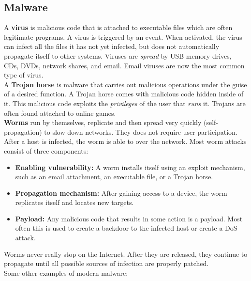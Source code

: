 \subsection{Malware}

A \textbf{virus} is malicious code that is attached to executable files which are often legitimate programs. A virus is triggered by an event. When activated, the virus can infect all the files it has not yet infected, but does not automatically propagate itself to other systems. Viruses are \emph{spread} by USB memory drives, CDs, DVDs, network shares, and email. Email viruses are now the most common type of virus.\\

A \textbf{Trojan horse} is malware that carries out malicious operations under the guise of a desired function. A Trojan horse comes with malicious code hidden inside of it. This malicious code exploits the \emph{privileges} of the user that \emph{runs} it. Trojans are often found attached to online games. \\

\textbf{Worms} run by themselves, replicate and then spread very quickly (self-propagation) to slow down networks. They does not require user participation. After a host is infected, the worm is able to  over the network. Most worm attacks consist of three components:

\begin{itemize}
\item \textbf{Enabling vulnerability:} A worm installs itself using an exploit mechanism, such as an email attachment, an executable file, or a Trojan horse.
\item \textbf{Propagation mechanism:} After gaining access to a device, the worm replicates itself and locates new targets.
\item \textbf{Payload:} Any malicious code that results in some action is a payload. Most often this is used to create a backdoor to the infected host or create a DoS attack.
\end{itemize}

\note Worms never really stop on the Internet. After they are released, they continue to propagate until all possible sources of infection are properly patched.\\

Some other examples of modern malware:


